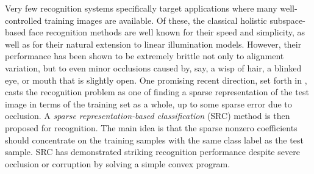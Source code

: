 \documentclass[10pt,journal,letterpaper,compsoc]{IEEEtran}
\begin{document}
Very few recognition systems specifically target applications where many well-
controlled training images are available.  Of these, the classical holistic
subspace-based face recognition methods \cite{Turk1991-CVPR,Belhumeur1997-PAMI}
are well known for their speed and simplicity, as well as for their natural
extension to linear illumination models.  However, their performance has been
shown to be extremely brittle not only to alignment variation, but to even
minor occlusions caused by, say, a wisp of hair, a blinked eye, or mouth that
is slightly open. One promising recent direction, set forth in
\cite{Wright2009-PAMI}, casts the recognition problem as one of finding a
sparse representation of the test image in terms of the training set as a
whole, up to some sparse error due to occlusion. A \emph{sparse
representation-based classification} (SRC) method is then proposed for
recognition. The main idea is that the sparse nonzero coefficients should
concentrate on the training samples with the same class label as the test
sample. SRC has demonstrated striking recognition performance despite severe
occlusion or corruption by solving a simple convex program.
\end{document}
